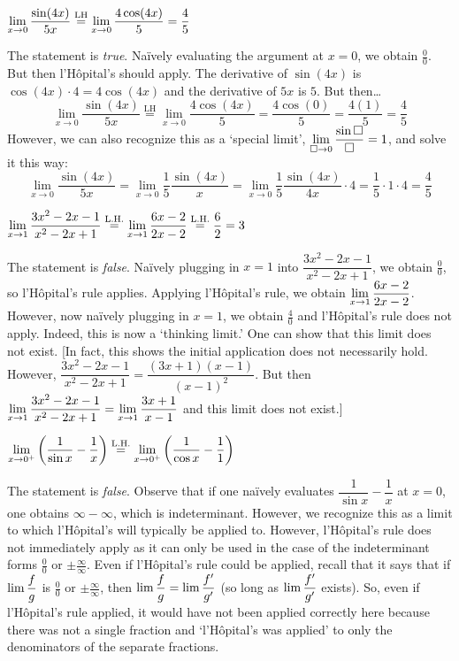 \documentclass[11pt,letterpaper]{article}
\begin{document}
 $\displaystyle\lim_{x \to 0} \dfrac{\sin(4x)}{5x} \stackrel{\text{LH}}{=} \lim_{x \to 0} \dfrac{4\cos(4x)}{5}= \dfrac{4}{5}$ \pspace

\sol The statement is \textit{true}. Na\"ively evaluating the argument at $x= 0$, we obtain $\frac{0}{0}$. But then l'H\^{o}pital's should apply. The derivative of $\sin(4x)$ is $\cos(4x) \cdot 4= 4 \cos(4x)$ and the derivative of $5x$ is $5$. But then\dots
	\[
	\lim_{x \to 0} \dfrac{\sin(4x)}{5x} \stackrel{\text{LH}}{=} \lim_{x \to 0} \dfrac{4\cos(4x)}{5}= \dfrac{4 \cos(0)}{5}= \dfrac{4(1)}{5}= \dfrac{4}{5}
	\]
However, we can also recognize this as a `special limit', $\displaystyle\lim_{\Box{} \to 0} \dfrac{\sin \Box{}}{\Box{}}= 1$, and solve it this way:
	\[
	\lim_{x \to 0} \dfrac{\sin(4x)}{5x}= \lim_{x \to 0} \dfrac{1}{5} \dfrac{\sin(4x)}{x}= \lim_{x \to 0} \dfrac{1}{5} \dfrac{\sin(4x)}{4x} \cdot 4= \dfrac{1}{5} \cdot 1 \cdot 4= \dfrac{4}{5}
	\] \pvspace{1.3cm}



 $\displaystyle\lim_{x \to 1} \dfrac{3x^2 - 2x - 1}{x^2 - 2x + 1} \stackrel{\text{L.H.}}{=} \lim_{x \to 1} \dfrac{6x - 2}{2x - 2} \stackrel{\text{L.H.}}{=} \dfrac{6}{2}= 3$ \pspace

\sol The statement is \textit{false}. Na\"ively plugging in $x= 1$ into $\dfrac{3x^2 - 2x - 1}{x^2 - 2x + 1}$, we obtain $\frac{0}{0}$, so l'H\^{o}pital's rule applies. Applying l'H\^{o}pital's rule, we obtain $\displaystyle\lim_{x \to 1} \dfrac{6x - 2}{2x - 2}$. However, now na\"ively plugging in $x= 1$, we obtain $\frac{4}{0}$ and l'H\^{o}pital's rule does not apply. Indeed, this is now a `thinking limit.' One can show that this limit does not exist. [In fact, this shows the initial application does not necessarily hold. However, $\dfrac{3x^2 - 2x - 1}{x^2 - 2x + 1}= \dfrac{(3x + 1)(x - 1)}{(x - 1)^2}$. But then $\displaystyle\lim_{x \to 1} \dfrac{3x^2 - 2x - 1}{x^2 - 2x + 1}= \lim_{x \to 1} \dfrac{3x + 1}{x - 1}$ and this limit does not exist.] \pvspace{1.3cm}



 $\displaystyle\lim_{x \to 0^+} \left( \dfrac{1}{\sin x} - \dfrac{1}{x} \right) \stackrel{\text{L.H.}}{=} \lim_{x \to 0^+} \left( \dfrac{1}{\cos x} - \dfrac{1}{1} \right)$ \pspace

\sol The statement is \textit{false}. Observe that if one na\"ively evaluates $\dfrac{1}{\sin x} - \dfrac{1}{x}$ at $x= 0$, one obtains $\infty - \infty$, which is indeterminant. However, we recognize this as a limit to which l'H\^opital's will typically be applied to. However, l'H\^opital's rule does not immediately apply as it can only be used in the case of the indeterminant forms $\frac{0}{0}$ or $\pm \frac{\infty}{\infty}$. Even if l'H\^opital's rule could be applied, recall that it says that if $\displaystyle\lim \frac{f}{g}$ is $\frac{0}{0}$ or $\pm \frac{\infty}{\infty}$, then $\displaystyle\lim \frac{f}{g}= \lim \frac{f'}{g'}$ (so long as $\displaystyle\lim \frac{f'}{g'}$ exists). So, even if l'H\^opital's rule applied, it would have not been applied correctly here because there was not a single fraction and `l'H\^opital's was applied' to only the denominators of the separate fractions. \pspace
\end{document}
